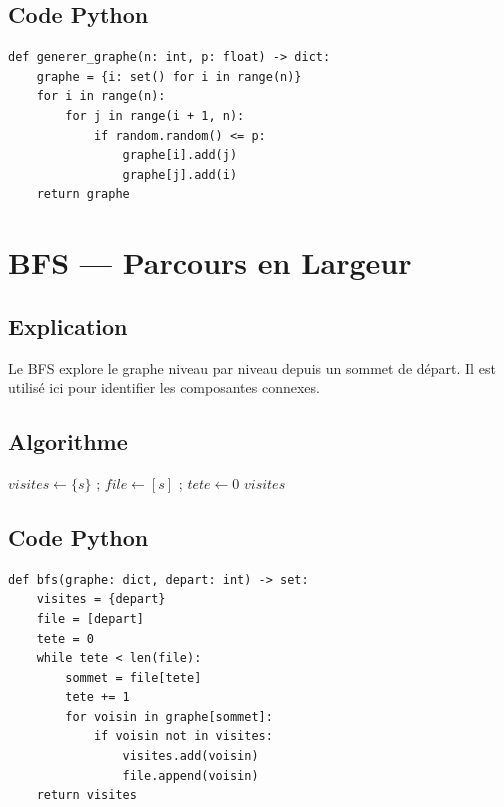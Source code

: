 \documentclass[12pt, a4paper]{article}
\begin{document}
\subsection{Code Python}
\begin{lstlisting}[style=python, caption={generer\_graphe(n, p)}]
def generer_graphe(n: int, p: float) -> dict:
    graphe = {i: set() for i in range(n)}
    for i in range(n):
        for j in range(i + 1, n):
            if random.random() <= p:
                graphe[i].add(j)
                graphe[j].add(i)
    return graphe
\end{lstlisting}

\section{BFS — Parcours en Largeur}
\subsection{Explication}
\begin{tcolorbox}[explication]
    Le BFS explore le graphe niveau par niveau depuis un sommet de départ. Il est utilisé ici pour identifier les composantes connexes.
\end{tcolorbox}

\subsection{Algorithme}
\begin{algorithm}[H]
    \caption{BFS — Parcours en largeur}
    $\mathit{visites} \leftarrow \{s\}$ ; $\mathit{file} \leftarrow [s]$ ; $\mathit{tete} \leftarrow 0$\;
    \Retourner $\mathit{visites}$\;
\end{algorithm}

\subsection{Code Python}
\begin{lstlisting}[style=python, caption={bfs(graphe, depart)}]
def bfs(graphe: dict, depart: int) -> set:
    visites = {depart}
    file = [depart]
    tete = 0
    while tete < len(file):
        sommet = file[tete]
        tete += 1
        for voisin in graphe[sommet]:
            if voisin not in visites:
                visites.add(voisin)
                file.append(voisin)
    return visites
\end{lstlisting}
\end{document}
